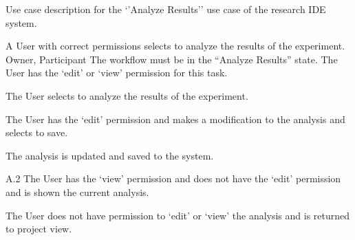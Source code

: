 \documentclass[document.tex]{subfiles}
\begin{document}
\begin{table}
  \centering
  \caption{Use case description for the `'Analyze Results'' use case of the research IDE system.}
  \label{tbl:use-case-analyze-results}

  \begin{usecase}
    A User with correct permissions selects to analyze the results of the experiment.
    Owner, Participant
    The workflow must be in the “Analyze Results” state. The User has the ‘edit’ or ‘view’ permission for this task.
    \ucnormal
    \begin{ucenum}
      \item The User selects to analyze the results of the experiment.
      \item The User has the ‘edit’ permission and makes a modification to the analysis and selects to save.
      \item The analysis is updated and saved to the system.
    \end{ucenum}
    \begin{ucenum}
      \item [A.2] The User has the ‘view’ permission and does not have the ‘edit’ permission and is shown the current analysis.
    \end{ucenum}
    The User does not have permission to ‘edit’ or ‘view’ the analysis and is returned to project view.
  \end{usecase}
\end{table}
\end{document}
